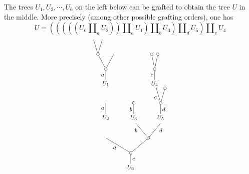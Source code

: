 \documentclass[a4paper,10pt]{article}%
\begin{document}
\begin{example} The trees $U_1, U_2,\cdots, U_6$ on the left below can be grafted to obtain the tree $U$ in the middle.
More precisely (among other possible grafting orders), one has
\begin{equation}\label{UFORMULA EQ}
U = \left(
		\left(
			\left(
				\left(
					\left(U_6 \amalg_a U_2 \right)
				\right) \amalg_a U_1
			\right) \amalg_b U_3
		\right) \amalg_d U_5
	\right) \amalg_c U_4
\end{equation}
\begin{equation}\label{SUBSDATUMTREES EQ}
	\begin{tikzpicture}[grow=up,auto,level distance=2.1em,
	every node/.style = {font=\footnotesize,inner sep=2pt},
	dummy/.style={circle,draw,inner sep=0pt,minimum size=1.375mm}]
\begin{scope}[xshift=-2em]
	\begin{scope}
	\tikzstyle{level 2}=[sibling distance=2.25em]%
	\tikzstyle{level 3}=[sibling distance=1.25em]%
		\node at (-0.25,3.2) {$U_1$}
			child{node [dummy] {}
				child
				child{node [dummy] {}
					child
					child
				}
			edge from parent node {$a$}};
	\end{scope}
		\node at (-0.25,1.5) {$U_2$}
			child{
		edge from parent node {$a$}};
		\node at (1.15,1.5) {$U_3$}
			child{node [dummy] {}
		edge from parent node {$b$}};
	\begin{scope}
	\tikzstyle{level 2}=[sibling distance=0.875em]%
		\node at (2.2,3.2) {$U_4$}
			child{node [dummy] {}
				child{node [dummy] {}}
				child{node [dummy] {}}
			edge from parent node {$c$}};
	\end{scope}
	\begin{scope}
		\tikzstyle{level 2}=[sibling distance=1.25em]%
		\node at (2.5,1.5) {$U_5$}
			child{node [dummy] {}
				child{node[dummy] {}}
				child{
				edge from parent node {$c$}}
			edge from parent node [swap] {$d$}};
	\end{scope}
	\begin{scope}
	\tikzstyle{level 2}=[sibling distance=3.5em]%
	\tikzstyle{level 3}=[sibling distance=2.25em]%
		\node at (1,-1) {$U_6$}
			child{node [dummy] {}
				child[sibling distance = 5em]{node [dummy] {}
					child[sibling distance = 3.5em]{edge from parent node [swap,near end] {$d$} }
					child[sibling distance = 3.5em]{edge from parent node [near end] {$b$} }
				}
				child[sibling distance = 7em]{ edge from parent node {$a$} }
			edge from parent node [swap] {$e$}};
	\end{scope}

\end{scope}
\end{tikzpicture}
\end{equation}
\end{example}
\end{document}
